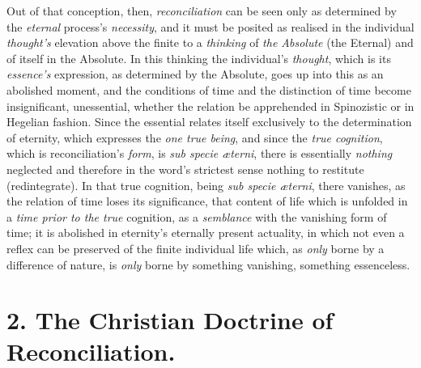 \documentclass[12pt,a4paper]{book}
\begin{document}
Out of that conception, then, \emph{reconciliation} can be seen only as
determined by the \emph{eternal} process's \emph{necessity}, and it must be
posited as realised in the individual \emph{thought's} elevation above the
finite to a \emph{thinking} of \emph{the Absolute} (the Eternal) and of itself in
the Absolute. In this thinking the individual's \emph{thought}, which is its
\emph{essence's} expression, as determined by the Absolute, goes up into this as
an abolished moment, and the conditions of time and the distinction of time
become insignificant, unessential, whether the relation be apprehended in
Spinozistic or in Hegelian fashion. Since the essential relates itself
exclusively to the determination of eternity, which expresses the \emph{one true
being}, and since the \emph{true cognition}, which is reconciliation's
\emph{form}, is \emph{\textit{sub specie æterni}}, there is essentially
\emph{nothing} neglected and therefore in the word's strictest sense nothing to
restitute (redintegrate). In that true cognition, being \textit{sub specie
æterni}, there vanishes, as the relation of time loses its significance, that
content of life which is unfolded in a \emph{time prior to the true} cognition,
as a \emph{semblance} with the vanishing form of time; it is abolished in
eternity's eternally present actuality, in which not even a reflex can be
preserved of the finite individual life which, as \emph{only} borne by a
difference of nature, is \emph{only} borne by something vanishing, something
essenceless.

\section*{2. The Christian Doctrine of Reconciliation.}
\end{document}
